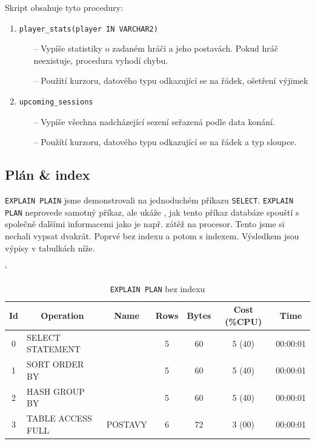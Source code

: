 \documentclass[a4paper, 11pt]{article}
\begin{document}
Skript obsahuje tyto procedury:

\begin{enumerate}
	\item \texttt{player\_stats(player IN VARCHAR2)}
		\begin{itemize}
			\item[--] Vypíše statistiky o zadaném hráči a jeho postavách. Pokud hráč neexistuje, procedura vyhodí chybu.  
			\item[--] Použítí kurzoru, datového typu odkazující se na řádek, ošetření výjimek
		\end{itemize}
	\item \texttt{upcoming\_sessions}
		\begin{itemize}
			\item[--] Vypíše všechna nadcházející sezení seřazená podle data konání.
			\item[--] Použítí kurzoru, datového typu odkazující se na řádek a typ sloupce.
		\end{itemize}
\end{enumerate}

\pagebreak

\subsection{Plán \& index}

\texttt{EXPLAIN PLAIN} jsme demonstrovali na jednoduchém příkazu \texttt{SELECT}. \texttt{EXPLAIN PLAN} neprovede samotný příkaz, ale ukáže , jak tento příkaz databáze spouští s společně dalšími informacemi jako je např. zátěž na procesor. Tento  jsme si nechali vypsat dvakrát. Poprvé bez indexu a potom s indexem. Výsledkem jsou výpisy v tabulkách níže.

\begin{table}[h]
	\catcode`
	\centering
	\scriptsize
	\begin{tabular}{clccccc}
		\textbf{Id} & \multicolumn{1}{c}{\textbf{Operation}} & \textbf{Name} & \textbf{Rows} & \textbf{Bytes} & \textbf{Cost (\%CPU)} & \textbf{Time} \\ \hline
		0           & SELECT STATEMENT                       &               & 5             & 60             & 5 (40)                & 00:00:01      \\
		1           & SORT ORDER BY                          &               & 5             & 60             & 5 (40)                & 00:00:01      \\
		2           & HASH GROUP BY                          &               & 5             & 60             & 5 (40)                & 00:00:01      \\
		3           & TABLE ACCESS FULL                      & POSTAVY       & 6             & 72             & 3 (00)                & 00:00:01     
	\end{tabular}
	\normalsize
	\caption{\texttt{EXPLAIN PLAN} bez indexu}
\end{table}
\end{document}
